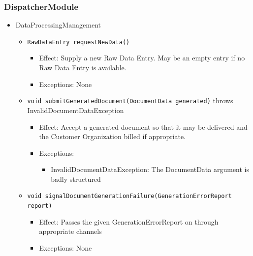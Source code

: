 \documentclass[a4paper,10pt]{article}
\begin{document}
\subsubsection*{DispatcherModule}
\begin{itemize}
    \item DataProcessingManagement
    \begin{itemize}
        \item \texttt{RawDataEntry requestNewData()}
        \begin{itemize}
            \item Effect: Supply a new Raw Data Entry. May be an empty entry if no Raw Data Entry is available.
            \item Exceptions: None
        \end{itemize}
        
        \item \texttt{void submitGeneratedDocument(DocumentData generated)} throws InvalidDocumentDataException
        \begin{itemize}
            \item Effect: Accept a generated document so that it may be delivered and the Customer Organization billed if appropriate.
            \item Exceptions:
            \begin{itemize}
            	\item InvalidDocumentDataException: The DocumentData argument is badly structured
            \end{itemize}
        \end{itemize}
        
        \item \texttt{void signalDocumentGenerationFailure(GenerationErrorReport report)}
        \begin{itemize}
        	\item Effect: Passes the given GenerationErrorReport on through appropriate channels
        	\item Exceptions: None
        \end{itemize}
        

\end{itemize}
\end{itemize}
\end{document}
